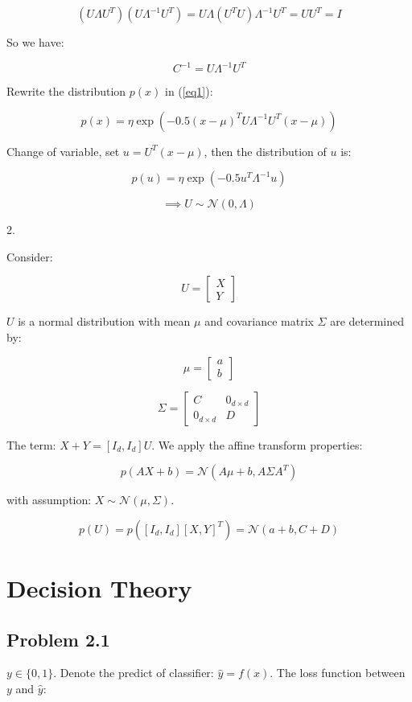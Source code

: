 \documentclass{article}
\begin{document}
$$
(U\Lambda U^T)(U\Lambda^{-1}U^T)=U\Lambda(U^TU)\Lambda^{-1}U^T=UU^T=I
$$

So we have:

$$
C^{-1} = U\Lambda^{-1}U^T
$$

Rewrite the distribution $p(x)$ in (\ref{eq1}):

$$
p(x) = \eta\exp(-0.5(x-\mu)^TU\Lambda^{-1}U^T(x-\mu))
$$

Change of variable, set $u=U^T(x-\mu)$, then the distribution of $u$ is:

$$
p(u) = \eta\exp(-0.5u^T\Lambda^{-1}u)
$$

$$
\implies U\sim \mathcal{N}(0,\Lambda)
$$

2.

Consider:

$$
U=\begin{bmatrix}
    X \\
    Y
\end{bmatrix}
$$

$U$ is a normal distribution with mean $\mu$ and covariance matrix $\Sigma$ are determined by:

$$
\mu = \begin{bmatrix}
    a \\
    b
\end{bmatrix}
$$

$$
\Sigma = \begin{bmatrix}
    C &0_{d\times d} \\
    0_{d\times d} &D
\end{bmatrix}
$$

The term: $X+Y=[I_d,I_d]U$. We apply the affine transform properties:

\begin{equation}
    p(AX+b) = \mathcal{N}(A\mu+b,A\Sigma A^T)
\end{equation}

with assumption: $X\sim \mathcal{N}(\mu,\Sigma)$.

$$
p(U) = p([I_d,I_d][X,Y]^T)=\mathcal{N}(a+b,C+D)
$$

\section{Decision Theory}

\subsection{Problem 2.1}

$y\in \{0,1\}$. Denote the predict of classifier: $\hat{y}=f(x)$. The loss function between $y$ and $\hat{y}$:
\end{document}
